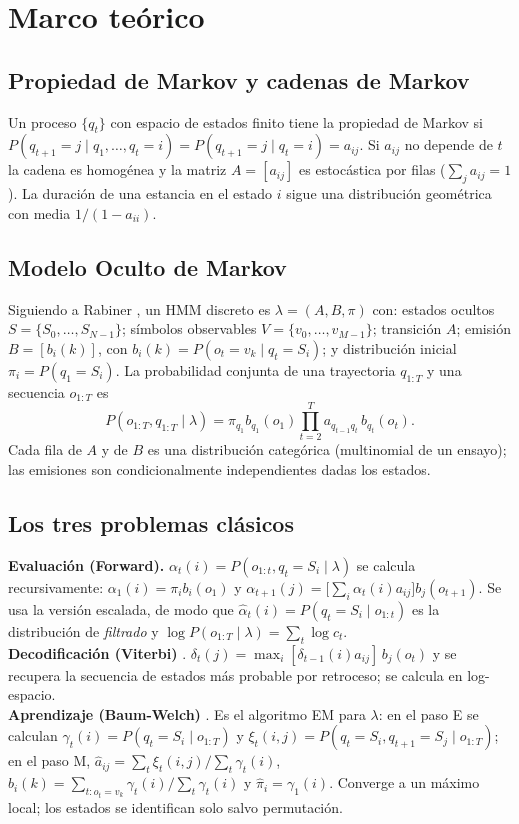 \documentclass[11pt,letterpaper]{article}
\begin{document}
\section{Marco teórico}
\subsection{Propiedad de Markov y cadenas de Markov}
Un proceso $\{q_t\}$ con espacio de estados finito tiene la propiedad de Markov si $P(q_{t+1}=j\mid q_1,\dots,q_t=i)=P(q_{t+1}=j\mid q_t=i)=a_{ij}$. Si $a_{ij}$ no depende de $t$ la cadena es homogénea y la matriz $A=[a_{ij}]$ es estocástica por filas ($\sum_j a_{ij}=1$). La duración de una estancia en el estado $i$ sigue una distribución geométrica con media $1/(1-a_{ii})$.

\subsection{Modelo Oculto de Markov}
Siguiendo a Rabiner \cite{rabiner1989}, un HMM discreto es $\lambda=(A,B,\pi)$ con: estados ocultos $S=\{S_0,\dots,S_{N-1}\}$; símbolos observables $V=\{v_0,\dots,v_{M-1}\}$; transición $A$; emisión $B=[b_i(k)]$, con $b_i(k)=P(o_t=v_k\mid q_t=S_i)$; y distribución inicial $\pi_i=P(q_1=S_i)$. La probabilidad conjunta de una trayectoria $q_{1:T}$ y una secuencia $o_{1:T}$ es
\begin{equation}
P(o_{1:T},q_{1:T}\mid\lambda)=\pi_{q_1}b_{q_1}(o_1)\prod_{t=2}^{T}a_{q_{t-1}q_t}\,b_{q_t}(o_t).
\end{equation}
Cada fila de $A$ y de $B$ es una distribución categórica (multinomial de un ensayo); las emisiones son condicionalmente independientes dadas los estados.

\subsection{Los tres problemas clásicos}
\textbf{Evaluación (Forward).} $\alpha_t(i)=P(o_{1:t},q_t=S_i\mid\lambda)$ se calcula recursivamente: $\alpha_1(i)=\pi_i b_i(o_1)$ y $\alpha_{t+1}(j)=\big[\sum_i\alpha_t(i)a_{ij}\big]b_j(o_{t+1})$. Se usa la versión escalada, de modo que $\hat\alpha_t(i)=P(q_t=S_i\mid o_{1:t})$ es la distribución de \emph{filtrado} y $\log P(o_{1:T}\mid\lambda)=\sum_t\log c_t$.\\
\textbf{Decodificación (Viterbi)} \cite{viterbi1967}. $\delta_t(j)=\max_i[\delta_{t-1}(i)a_{ij}]\,b_j(o_t)$ y se recupera la secuencia de estados más probable por retroceso; se calcula en log-espacio.\\
\textbf{Aprendizaje (Baum-Welch)} \cite{baum1970,dempster1977}. Es el algoritmo EM para $\lambda$: en el paso E se calculan $\gamma_t(i)=P(q_t=S_i\mid o_{1:T})$ y $\xi_t(i,j)=P(q_t=S_i,q_{t+1}=S_j\mid o_{1:T})$; en el paso M, $\hat a_{ij}=\sum_t\xi_t(i,j)/\sum_t\gamma_t(i)$, $\hat b_i(k)=\sum_{t:o_t=v_k}\gamma_t(i)/\sum_t\gamma_t(i)$ y $\hat\pi_i=\gamma_1(i)$. Converge a un máximo local; los estados se identifican solo salvo permutación.
\end{document}
